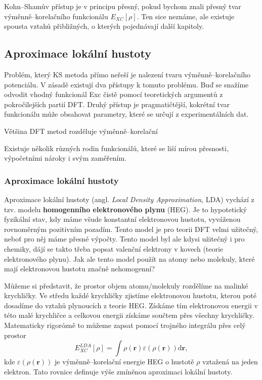 Kohn--Shamův přístup je v principu přesný, pokud bychom znali přesný tvar výměnně--korelačního funkcionálu $E_{XC}[\rho]$.
Ten sice neznáme, ale existuje spousta vztahů přibližných, o kterých pojednávají další kapitoly.


\subsection{Aproximace lokální hustoty}
Problém, který KS metoda přímo neřeší je nalezení tvaru výměnně--korelačního potenciálu.
V zásadě existují dva přístupy k tomuto problému. Buď se snažíme odvodit vhodný funkcionál Exc čistě pomocí teoretických argumentů z pokročilejších partií DFT. Druhý přístup je pragmatičtější, kokrétní tvar funkcionálu může obsahovat parametry, které se určují z experimentálních dat.

Většina DFT metod rozděluje výměnně--korelační 

Existuje několik různých rodin funkcionálů, které se liší mírou přesnosti, výpočetními nároky i svým zaměřením.

\subsubsection{Aproximace lokální hustoty}
Aproximace lokální hustoty (angl. \textit{Local Density Approximation}, LDA) vychází z tzv. modelu \textbf{homogenního elektronového plynu} (HEG). Je to hypotetický fyzikální stav, kdy máme všude konstantní elektronovou hustotu, vyváženou rovnoměrným pozitivním pozadím. Tento model je pro teorii DFT velmi užitečný, neboť pro něj máme přesné výpočty. Tento model byl ale kdysi užitečný i pro chemiky, dájí se takto třeba popsat valenční elektrony v kovech (teorie elektronového plynu). Jak ale tento model použít na atomy nebo molekuly, které mají elektronovou hustotu značně nehomogenní?

Můžeme si představit, že prostor objem atomu/molekuly rozdělíme na malinké krychličky. Ve středu každé krychličky zjistíme elektronovou hustotu, kterou poté dosadíme do vztahů plynoucích z teorie HEG.
Získáme tím elektronovou energii v této malé krychličce a celkovou energii získáme součtem přes všechny krychličky. Matematicky rigorózně to můžeme zapsat pomocí trojného integrálu přes celý prostor
\begin{equation}
E_{XC}^{LDA}[\rho]=\int \rho(\textbf{r}) \varepsilon(\rho(\textbf{r})) \mathrm{d}\textbf{r} ,
\end{equation}
kde $\varepsilon(\rho(\textbf{r}))$ je výměnně--korelační energie HEG o hustotě $\rho$ vztažená na jeden elektron. Tato rovnice definuje výše zmíněnou aproximaci lokální hustoty.

